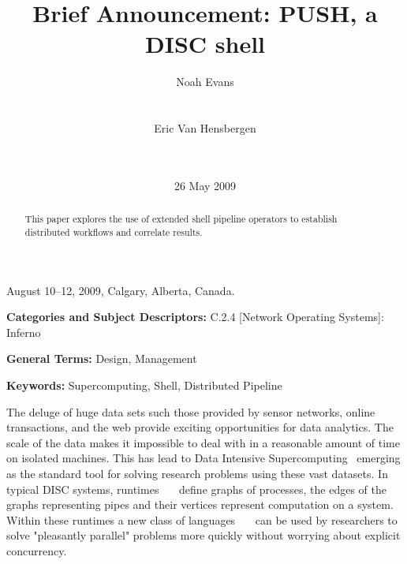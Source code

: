 \documentclass{sig-alt-release2}
\begin{document}
 {August 10--12, 2009, Calgary, Alberta, Canada.} 
\title{Brief Announcement: PUSH, a DISC shell}

\author{
\alignauthor Noah Evans \\
\\
\\
\alignauthor Eric Van Hensbergen \\
\\
\\
}
\date{26 May 2009}

\maketitle

\begin{abstract}
This paper explores the use of extended shell pipeline operators to
establish distributed workflows and correlate results.
\end{abstract}

\vspace{1mm}
\noindent
{\bf Categories and Subject Descriptors:} C.2.4 {[Network Operating Systems]}: {Inferno}

\vspace{1mm}
\noindent
{\bf General Terms:} Design, Management 

\vspace{1mm}
\noindent
{\bf Keywords:} Supercomputing, Shell, Distributed Pipeline

The deluge of huge data sets such those provided by sensor networks, 
online transactions, and the web provide exciting opportunities for data
analytics.  The scale of the data makes it impossible to deal with in a
reasonable amount of time on isolated machines.
This has lead to Data Intensive Supercomputing~\cite{bryant2007dis} emerging
as the standard tool for solving research problems using these vast datasets.
In typical DISC systems, 
runtimes~\cite{dean2008msd}~\cite{bialecki:hfr}~\cite{isard2007ddd} define 
graphs of processes, the edges of the graphs representing 
pipes and their vertices represent computation on a system.  
Within these runtimes a new class of 
languages~\cite{pike2005idp}~\cite{yu2008dsg}~\cite{olston2008pln} can be used by researchers to solve "pleasantly parallel" 
problems more quickly without worrying about explicit concurrency.
\end{document}
